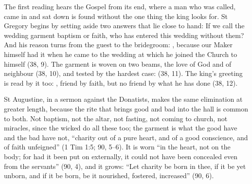 The first reading hears the Gospel from its end, where a man who was called,
came in and sat down is found without the one thing the king looks for. St
Gregory begins by setting aside two answers that lie close to hand:
 If we call the wedding garment baptism or faith,
who has entered this wedding without them?  And his reason turns from the guest to the
bridegroom: , because
our Maker himself had it when he came to the wedding at which he joined the
Church to himself (38, 9). The garment is woven on two beams, the love of God
and of neighbour (38, 10), and tested by the hardest case:  (38, 11). The king's greeting is read by it too: , friend by faith, but no
friend by what he has done (38, 12).

St Augustine, in a sermon against the Donatists, makes the same elimination at
greater length, because the rite that brings good and bad into the hall is
common to both. Not baptism, not the altar, not fasting, not coming to church,
not miracles, since the wicked do all these too; the garment is what the good
have and the bad have not, ``charity out of a pure heart, and of a good
conscience, and of faith unfeigned'' (1 Tim 1:5;  90, 5--6). It is
worn ``in the heart, not on the body; for had it been put on externally, it
could not have been concealed even from the servants'' (90, 4), and it grows:
``Let charity be born in thee, if it be yet unborn, and if it be born, be it
nourished, fostered, increased'' (90, 6).

